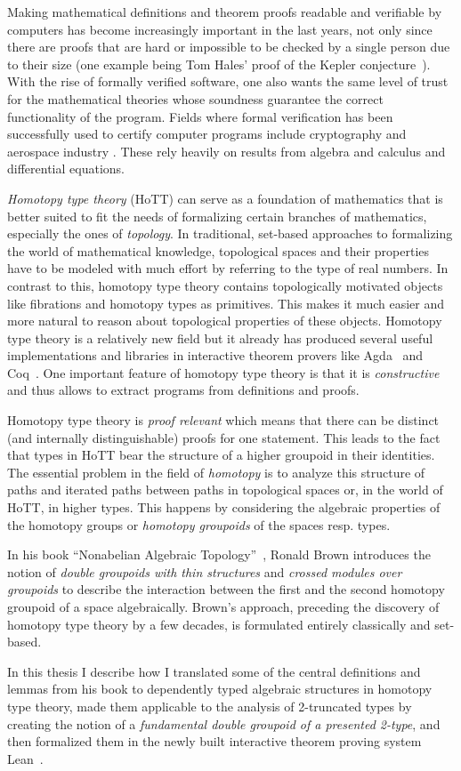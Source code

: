 Making mathematical definitions and theorem proofs readable and verifiable by
computers has become increasingly important in the last years, not only since there
are proofs that are hard or impossible to be checked by a single person due to their
size (one example being Tom Hales' proof of the Kepler conjecture~\cite{flyspeck}).
With the rise of formally verified software, one also wants the same level of trust
for the mathematical theories whose soundness guarantee the correct functionality
of the program.
Fields where formal verification has been successfully used to certify computer
programs include cryptography \cite{crypto} and aerospace industry \cite{aerospace}.
These rely heavily on results from algebra and calculus and differential equations.

\emph{Homotopy type theory} (HoTT) can serve as a foundation of mathematics
that is better suited to fit the needs of formalizing certain branches of mathematics,
especially the ones of \emph{topology}.
In traditional, set-based approaches to formalizing the world
of mathematical knowledge, topological spaces and their properties
have to be modeled with much effort by referring to the type of real numbers.
In contrast to this, homotopy type theory contains topologically motivated objects
like fibrations and homotopy types as primitives.
This makes it much easier and more natural to reason about topological properties
of these objects.
Homotopy type theory is a relatively new field but it already has produced several
useful implementations and libraries in interactive theorem provers like
Agda~\cite{hott-agda} and Coq~\cite{hott-coq}.
One important feature of homotopy
type theory is that it is \emph{constructive} and thus allows to extract programs
from definitions and proofs.

Homotopy type theory is \emph{proof relevant} which means that there can be distinct
(and internally distinguishable) proofs for one statement.
This leads to the fact that types in HoTT bear the structure of a higher groupoid
in their identities.
The essential problem in the field of \emph{homotopy} is to analyze this structure
of paths and iterated paths between paths in topological spaces or,
in the world of HoTT, in higher types.
This happens by considering the algebraic properties of the homotopy groups or
\emph{homotopy groupoids} of the spaces resp. types.

In his book ``Nonabelian Algebraic Topology''~\cite{nat}, Ronald Brown
introduces the notion of \emph{double groupoids with thin structures} and
\emph{crossed modules over groupoids} to describe the interaction between
the first and the second homotopy groupoid of a space algebraically.
Brown's approach, preceding the discovery of homotopy type theory by a few
decades, is formulated entirely classically and set-based.

In this thesis I describe how I translated some of the central definitions and
lemmas from his book to dependently typed algebraic structures in homotopy type
theory, made them applicable to the analysis of 2-truncated types by creating
the notion of a \emph{fundamental double groupoid of a presented 2-type},
and then formalized them in the newly built interactive theorem proving system
Lean~\cite{lean1}.



